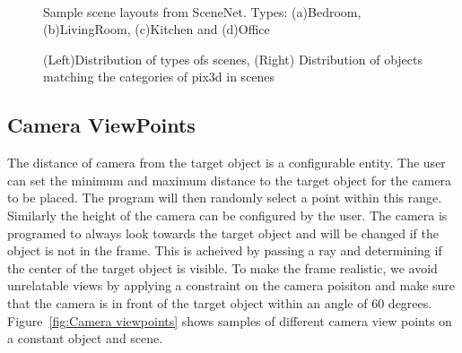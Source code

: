 \begin{figure}[!ht]
    \centering
    \quad
    \\
    \quad
    \caption{Sample scene layouts from SceneNet. Types: (a)Bedroom, (b)LivingRoom, (c)Kitchen and (d)Office}
    \label{fig:Scene Types}
\end{figure}


\begin{figure}[!ht]
    \resizebox{0.49\textwidth}{6cm}{}
    \resizebox{0.49\textwidth}{6cm}{}
    \caption{(Left)Distribution of types ofs scenes, (Right) Distribution of objects matching the categories of pix3d in scenes}
    \label{fig:distribution of scenes}
\end{figure}


\subsection{Camera ViewPoints}\label{subsec:camera-viewpoints}

The distance of camera from the target object is a configurable entity.
The user can set the minimum and maximum distance to the target object for the camera to be placed.
The program will then randomly select a point within this range.
Similarly the height of the camera can be configured by the user.
The camera is programed to always look towards the target object and will be changed if the object is not in the frame.
This is acheived by passing a ray and determining if the center of the target object is visible.
To make the frame realistic, we avoid unrelatable views by applying a constraint on the camera poisiton and make sure that the camera is in front of the target object within an angle of 60 degrees.
Figure~\ref{fig:Camera viewpoints} shows samples of different camera view points on a constant object and scene.

